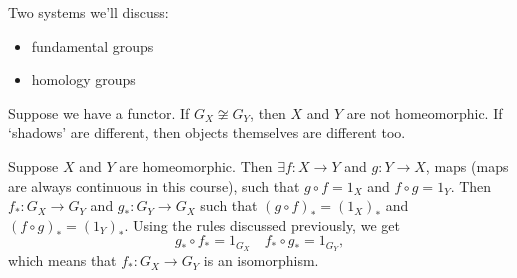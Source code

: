 Two systems we'll discuss:
\begin{itemize}
    \item fundamental groups
    \item homology groups
\end{itemize}


\begin{eg}
    Suppose we have a functor.
    If $G_X \not\cong G_Y$, then  $X$ and  $Y$ are not homeomorphic.
    If `shadows' are different, then objects themselves are different too.
\end{eg}
\begin{explanation}
    Suppose $X$ and $Y$ are homeomorphic.
    Then $\exists f: X \to  Y$ and $g: Y \to  X$, maps (maps are always continuous in this course), such that $g  \circ f = 1_X$ and $f \circ g = 1_Y$.
    Then $f_*: G_X \to G_Y$ and $g_*: G_Y \to  G_X$ such that $(g \circ f)_* = (1_X)_*$ and  $(f \circ g)_* = (1_Y)_*$. Using the rules discussed previously, we get
    \[
    g_*  \circ f_* = 1_{G_X} \quad f_*  \circ  g_* = 1_{G_Y}
    ,\] 
    which means that $f_* : G_X \to  G_Y$ is an isomorphism.
\end{explanation}